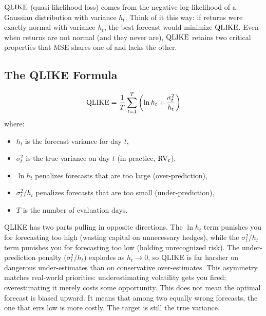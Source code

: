 $\operatorname{QLIKE}$ (quasi-likelihood loss) comes from the negative log-likelihood of a Gaussian distribution with variance $h_t$.
Think of it this way: if returns were exactly normal with variance $h_t$, the best forecast would minimize $\operatorname{QLIKE}$.
Even when returns are not normal (and they never are), $\operatorname{QLIKE}$ retains two critical properties that MSE shares one of and lacks the other.

\subsection{The QLIKE Formula}

\begin{equation}
\label{eq:qlike}
\operatorname{QLIKE} = \frac{1}{T}\sum_{t=1}^{T} \left(\ln h_t + \frac{\sigma^2_t}{h_t}\right)
\end{equation}
where:
\begin{itemize}[nosep]
  \item $h_t$ is the forecast variance for day $t$,
  \item $\sigma^2_t$ is the true variance on day $t$ (in practice, $\operatorname{RV}_t$),
  \item $\ln h_t$ penalizes forecasts that are too large (over-prediction),
  \item $\sigma^2_t / h_t$ penalizes forecasts that are too small (under-prediction),
  \item $T$ is the number of evaluation days.
\end{itemize}

\begin{intuition}
QLIKE has two parts pulling in opposite directions.
The $\ln h_t$ term punishes you for forecasting too high (wasting capital on unnecessary hedges), while the $\sigma^2_t / h_t$ term punishes you for forecasting too low (holding unrecognized risk).
The under-prediction penalty ($\sigma^2_t / h_t$) explodes as $h_t \to 0$, so QLIKE is far harsher on dangerous under-estimates than on conservative over-estimates.
This asymmetry matches real-world priorities: underestimating volatility gets you fired; overestimating it merely costs some opportunity.
This does not mean the optimal forecast is biased upward.
It means that among two equally wrong forecasts, the one that errs low is more costly.
The target is still the true variance.
\end{intuition}

